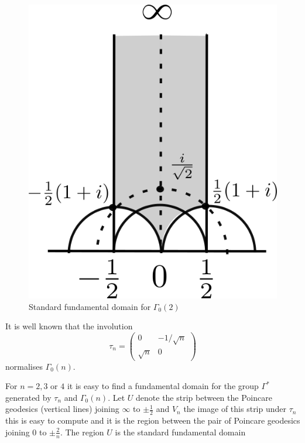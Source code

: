 \documentclass[12pt,a4paper]{amsart}
\begin{document}
\begin{figure}[hb]
\begin{center}
\includegraphics[scale=.5]{fund_dom2.png} 
\end{center}
\caption{Standard fundamental domain for $\Gamma_0(2)$}
\label{fund}
\end{figure}

It  is  well  known  that the involution 
$$  \tau_n  = \begin{pmatrix} 0 & -1/\sqrt{n} \\ \sqrt{n} &  0  \end{pmatrix} $$
normalises  $\Gamma_0(n)$.


For $n = 2,3$  or $4$ it is easy to find a fundamental domain for the  group
$\Gamma^*$ generated by $\tau_n$ and  $\Gamma_0(n)$. Let $U$ denote the strip
between the Poincare  geodesics (vertical lines) joining $\infty$ to $\pm
\frac12$ and $V_n$  the image of this strip under $\tau_n$ this is easy to
compute and it  is the region between the pair of Poincare  geodesics joining
$0$ to $\pm \frac{2}{n}$. 
The  region $U$ is the standard fundamental domain
\end{document}

